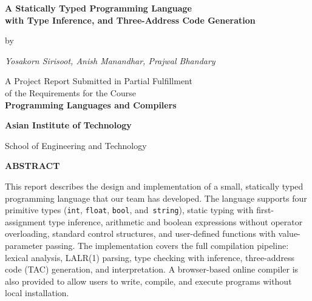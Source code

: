 \documentclass[12pt,a4paper]{report}
\newcommand{\tint}{\texttt{int}}
\newcommand{\tfloat}{\texttt{float}}
\newcommand{\tbool}{\texttt{bool}}
\newcommand{\tstring}{\texttt{string}}
\begin{document}

\begin{titlepage}
  \centering
  \vspace*{2cm}

  {\large\bfseries A Statically Typed Programming Language\\[0.4em]
  with Type Inference, and Three-Address Code Generation\\[0.4em]
  \par}

  \vspace{1cm}

  {\normalsize by\par}
  \vspace{0.5cm}

  {\large\itshape Yosakorn Sirisoot, Anish Manandhar, Prajwal Bhandary\par}

  \vspace{2cm}

  {\large
  A Project Report Submitted in Partial Fulfillment\\
  of the Requirements for the Course\\[0.5em]
  \textbf{Programming Languages and Compilers}\\[2cm]
  }

  {\large\bfseries Asian Institute of Technology\par}
  \vspace{0.3cm}
  {\normalsize School of Engineering and Technology\par}
  \vspace{0.3cm}

  \vfill
\end{titlepage}

\clearpage
{}
\begin{center}
  {\large\bfseries ABSTRACT}
\end{center}
\vspace{1em}

This report describes the design and implementation of a small,
statically typed programming language that our team has developed.
The language supports four primitive types (\tint, \tfloat, \tbool,
and~\tstring), static typing with first-assignment type inference, arithmetic
and boolean expressions without operator overloading, standard control
structures, and user-defined functions with value-parameter passing.
The implementation covers the full compilation pipeline: lexical analysis,
LALR(1) parsing, type checking with inference, three-address code (TAC)
generation, and interpretation. A browser-based online compiler is also
provided to allow users to write, compile, and execute programs without
local installation.
\end{document}
